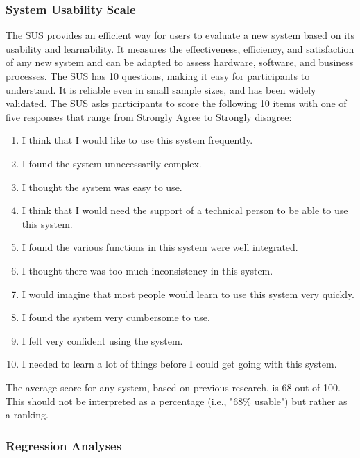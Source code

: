\documentclass{sigchi}
\begin{document}
\subsubsection{System Usability Scale}

The SUS provides an efficient way for users to evaluate a new system based on its usability and learnability. It measures the effectiveness, efficiency, and satisfaction of any new system and can be adapted to assess hardware, software, and business processes. The SUS has 10 questions, making it easy for participants to understand. It is reliable even in small sample sizes, and has been widely validated. The SUS asks participants to score the following 10 items with one of five responses that range from Strongly Agree to Strongly disagree:

\begin{enumerate}
    \item I think that I would like to use this system frequently.
    \item I found the system unnecessarily complex.
    \item I thought the system was easy to use.
    \item I think that I would need the support of a technical person to be able to use this system.
    \item I found the various functions in this system were well integrated.
    \item I thought there was too much inconsistency in this system.
    \item I would imagine that most people would learn to use this system very quickly.
    \item I found the system very cumbersome to use.
    \item I felt very confident using the system.
    \item I needed to learn a lot of things before I could get going with this system.
\end{enumerate}

The average score for any system, based on previous research, is 68 out of 100. This should not be interpreted as a percentage (i.e., "68\% usable") but rather as a ranking. 

\subsubsection{Regression Analyses}
\end{document}
